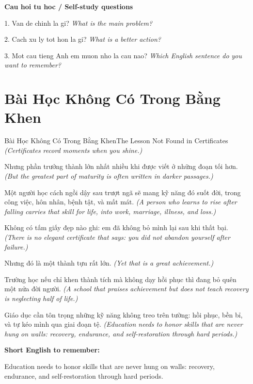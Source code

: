 \begin{tuhocnhanh}
\textbf{Cau hoi tu hoc / Self-study questions}

1. Van de chinh la gi? \textit{What is the main problem?}

2. Cach xu ly tot hon la gi? \textit{What is a better action?}

3. Mot cau tieng Anh em muon nho la cau nao? \textit{Which English sentence do you want to remember?}
\end{tuhocnhanh}
\ngancach

\section{Bài Học Không Có Trong Bằng Khen}
\begin{truyen}{Bài Học Không Có Trong Bằng Khen}{The Lesson Not Found in Certificates}
\textit{(Certificates record moments when you shine.)}

Nhưng phần trưởng thành lớn nhất nhiều khi được viết ở những đoạn tối hơn.
\textit{(But the greatest part of maturity is often written in darker passages.)}

Một người học cách ngồi dậy sau trượt ngã sẽ mang kỹ năng đó suốt đời, trong công việc, hôn nhân, bệnh tật, và mất mát.
\textit{(A person who learns to rise after falling carries that skill for life, into work, marriage, illness, and loss.)}

Không có tấm giấy đẹp nào ghi: em đã không bỏ mình lại sau khi thất bại.
\textit{(There is no elegant certificate that says: you did not abandon yourself after failure.)}

Nhưng đó là một thành tựu rất lớn.
\textit{(Yet that is a great achievement.)}

Trường học nếu chỉ khen thành tích mà không dạy hồi phục thì đang bỏ quên một nửa đời người.
\textit{(A school that praises achievement but does not teach recovery is neglecting half of life.)}

\end{truyen}

\begin{baihoc}
Giáo dục cần tôn trọng những kỹ năng không treo trên tường: hồi phục, bền bỉ, và tự kéo mình qua giai đoạn tệ.
\textit{(Education needs to honor skills that are never hung on walls: recovery, endurance, and self-restoration through hard periods.)}
\end{baihoc}

\begin{ghinhoanh}
\textbf{Short English to remember:}

Education needs to honor skills that are never hung on walls: recovery, endurance, and self-restoration through hard periods.

\end{ghinhoanh}

